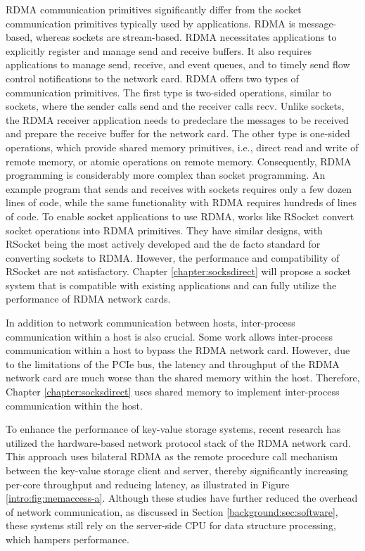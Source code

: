 RDMA communication primitives significantly differ from the socket communication primitives typically used by applications. RDMA is message-based, whereas sockets are stream-based. RDMA necessitates applications to explicitly register and manage send and receive buffers. It also requires applications to manage send, receive, and event queues, and to timely send flow control notifications to the network card. RDMA offers two types of communication primitives. The first type is two-sided operations, similar to sockets, where the sender calls send and the receiver calls recv. Unlike sockets, the RDMA receiver application needs to predeclare the messages to be received and prepare the receive buffer for the network card. The other type is one-sided operations, which provide shared memory primitives, i.e., direct read and write of remote memory, or atomic operations on remote memory. Consequently, RDMA programming is considerably more complex than socket programming. An example program that sends and receives with sockets requires only a few dozen lines of code, while the same functionality with RDMA requires hundreds of lines of code. To enable socket applications to use RDMA, works like RSocket \cite{rsockets,socketsdirect,russell2008extended} convert socket operations into RDMA primitives. They have similar designs, with RSocket being the most actively developed and the de facto standard for converting sockets to RDMA. However, the performance and compatibility of RSocket are not satisfactory. Chapter \ref{chapter:socksdirect} will propose a socket system that is compatible with existing applications and can fully utilize the performance of RDMA network cards.

In addition to network communication between hosts, inter-process communication within a host is also crucial. Some work \cite {belay2017ix,peter2016arrakis,rsockets} allows inter-process communication within a host to bypass the RDMA network card. However, due to the limitations of the PCIe bus, the latency and throughput of the RDMA network card are much worse than the shared memory within the host. Therefore, Chapter \ref{chapter:socksdirect} uses shared memory to implement inter-process communication within the host.

To enhance the performance of key-value storage systems, recent research \cite {kalia2014using,kalia2016design,kalia2014using,kalia2016design} has utilized the hardware-based network protocol stack of the RDMA network card. This approach uses bilateral RDMA as the remote procedure call mechanism between the key-value storage client and server, thereby significantly increasing per-core throughput and reducing latency, as illustrated in Figure \ref{intro:fig:memaccess-a}. Although these studies have further reduced the overhead of network communication, as discussed in Section \ref{background:sec:software}, these systems still rely on the server-side CPU for data structure processing, which hampers performance.

